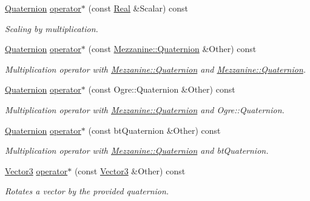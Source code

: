 \begin{DoxyCompactItemize}
\hyperlink{classMezzanine_1_1Quaternion}{Quaternion} \hyperlink{classMezzanine_1_1Quaternion_a61e1e32521a5353287f158c091d41aaa}{operator$\ast$} (const \hyperlink{namespaceMezzanine_a726731b1a7df72bf3583e4a97282c6f6}{Real} \&Scalar) const 
\begin{DoxyCompactList}\small\item\em Scaling by multiplication. \item\end{DoxyCompactList}\item 
\hyperlink{classMezzanine_1_1Quaternion}{Quaternion} \hyperlink{classMezzanine_1_1Quaternion_a2b0f4229f959551b88409519aa72af37}{operator$\ast$} (const \hyperlink{classMezzanine_1_1Quaternion}{Mezzanine::Quaternion} \&Other) const 
\begin{DoxyCompactList}\small\item\em Multiplication operator with \hyperlink{classMezzanine_1_1Quaternion}{Mezzanine::Quaternion} and \hyperlink{classMezzanine_1_1Quaternion}{Mezzanine::Quaternion}. \item\end{DoxyCompactList}\item 
\hyperlink{classMezzanine_1_1Quaternion}{Quaternion} \hyperlink{classMezzanine_1_1Quaternion_af93091572666960580ed5c9cd07a1774}{operator$\ast$} (const Ogre::Quaternion \&Other) const 
\begin{DoxyCompactList}\small\item\em Multiplication operator with \hyperlink{classMezzanine_1_1Quaternion}{Mezzanine::Quaternion} and Ogre::Quaternion. \item\end{DoxyCompactList}\item 
\hyperlink{classMezzanine_1_1Quaternion}{Quaternion} \hyperlink{classMezzanine_1_1Quaternion_ac0476b5a3b8301905865d1d38c79fc67}{operator$\ast$} (const btQuaternion \&Other) const 
\begin{DoxyCompactList}\small\item\em Multiplication operator with \hyperlink{classMezzanine_1_1Quaternion}{Mezzanine::Quaternion} and btQuaternion. \item\end{DoxyCompactList}\item 
\hyperlink{classMezzanine_1_1Vector3}{Vector3} \hyperlink{classMezzanine_1_1Quaternion_a26e4cc96e10317d217569eba576e9018}{operator$\ast$} (const \hyperlink{classMezzanine_1_1Vector3}{Vector3} \&Other) const 
\begin{DoxyCompactList}\small\item\em Rotates a vector by the provided quaternion. \item\end{DoxyCompactList}\item 

\end{DoxyCompactItemize}
